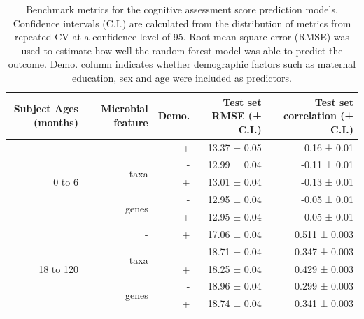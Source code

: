 \documentclass{article}
\begin{document}
\begin{table}[!h]
    \begin{center}
    \begin{tabular}{|r|r|r|r|r|}
      \hline\hline
      \textbf{Subject Ages (months)} & \textbf{Microbial feature} & \textbf{Demo.} &  \textbf{Test set RMSE (± C.I.)} & \textbf{Test set correlation (± C.I.)} \\\hline
      \multirow{5}{*}{0 to 6} & -    & + & 13.37 ± 0.05 & -0.16 ± 0.01 \\ \cline{2-5}
            & \multirow{2}{*}{taxa}  & - & 12.99 ± 0.04 & -0.11 ± 0.01 \\ \cline{3-5}
            &                        & + & 13.01 ± 0.04 & -0.13 ± 0.01 \\ \cline{2-5}
            & \multirow{2}{*}{genes} & - & 12.95 ± 0.04 & -0.05 ± 0.01 \\ \cline{3-5}
            &                        & + & 12.95 ± 0.04 & -0.05 ± 0.01 \\ \cline{1-5}
      \multirow{5}{*}{18 to 120} & - & + & 17.06 ± 0.04 & 0.511 ± 0.003 \\ \cline{2-5}
            & \multirow{2}{*}{taxa}  & - & 18.71 ± 0.04 & 0.347 ± 0.003 \\ \cline{3-5}
            &                        & + & 18.25 ± 0.04 & 0.429 ± 0.003 \\ \cline{2-5}
            & \multirow{2}{*}{genes} & - & 18.96 ± 0.04 & 0.299 ± 0.003 \\ \cline{3-5}
            &                        & + & 18.74 ± 0.04 & 0.341 ± 0.003 \\ \hline\hline
    \end{tabular}
    \caption{\label{tab:rfbench}Benchmark metrics for the cognitive assessment score
    prediction models. Confidence intervals (C.I.) are calculated from the
    distribution of metrics from repeated CV at a confidence level of 95.
    Root mean square error (RMSE) was used to estimate how well the random forest model was able to predict the outcome.
    Demo. column indicates whether demographic factors such as maternal education, sex and age were included as predictors.}
    \end{center}
\end{table}
\end{document}
